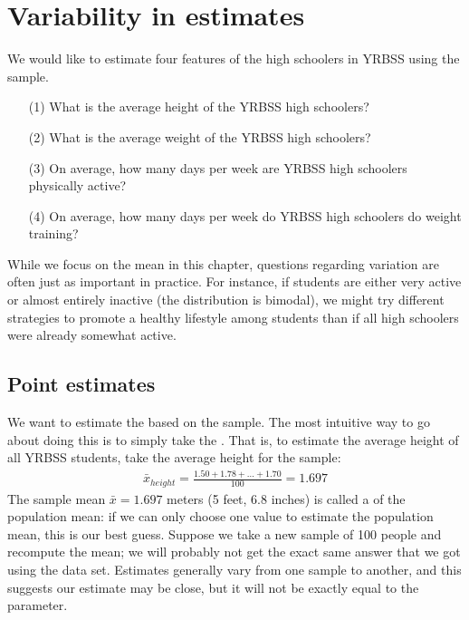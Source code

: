 \section{Variability in estimates}
\label{variabilityInEstimates}


We would like to estimate four features of the high schoolers in YRBSS using the sample. 
\begin{itemize}
\setlength{\itemsep}{0mm}
\item[(1)] What is the average height of the YRBSS high schoolers?
\item[(2)] What is the average weight of the YRBSS high schoolers?
\item[(3)] On average, how many days per week are YRBSS high schoolers physically active?
\item[(4)] On average, how many days per week do YRBSS high schoolers do weight training?
\end{itemize}
While we focus on the mean in this chapter, questions regarding variation are often just as important in practice. For instance, if students are either very active or almost entirely inactive (the distribution is bimodal), we might try different strategies to promote a healthy lifestyle among students than if all high schoolers were already somewhat active.


\subsection{Point estimates}
\label{pointEstimates}


We want to estimate the  based on the sample. The most intuitive way to go about doing this is to simply take the . That is, to estimate the average height of all YRBSS students, take the average height for the sample:
\begin{eqnarray*}
\bar{x}_{height} = \frac{1.50 + 1.78 + \dots + 1.70}{100} = 1.697
\end{eqnarray*}
The sample mean $\bar{x} = 1.697$ meters (5 feet, 6.8 inches) is called a  of the population mean: if we can only choose one value to estimate the population mean, this is our best guess. Suppose we take a new sample of 100 people and recompute the mean; we will probably not get the exact same answer that we got using the  data set. Estimates generally vary from one sample to another, and this  suggests our estimate may be close, but it will not be exactly equal to the parameter.

